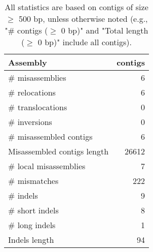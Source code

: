 \documentclass[12pt,a4paper]{article}
\begin{document}
\begin{table}[ht]
\begin{center}
\caption{All statistics are based on contigs of size $\geq$ 500 bp, unless otherwise noted (e.g., "\# contigs ($\geq$ 0 bp)" and "Total length ($\geq$ 0 bp)" include all contigs).}
\begin{tabular}{|l*{1}{|r}|}
\hline
Assembly & contigs \\ \hline
\# misassemblies & 6 \\ \hline
\hspace{5mm}\# relocations & 6 \\ \hline
\hspace{5mm}\# translocations & 0 \\ \hline
\hspace{5mm}\# inversions & 0 \\ \hline
\# misassembled contigs & 6 \\ \hline
Misassembled contigs length & 26612 \\ \hline
\# local misassemblies & 7 \\ \hline
\# mismatches & 222 \\ \hline
\# indels & 9 \\ \hline
\hspace{5mm}\# short indels & 8 \\ \hline
\hspace{5mm}\# long indels & 1 \\ \hline
Indels length & 94 \\ \hline
\end{tabular}
\end{center}
\end{table}
\end{document}
